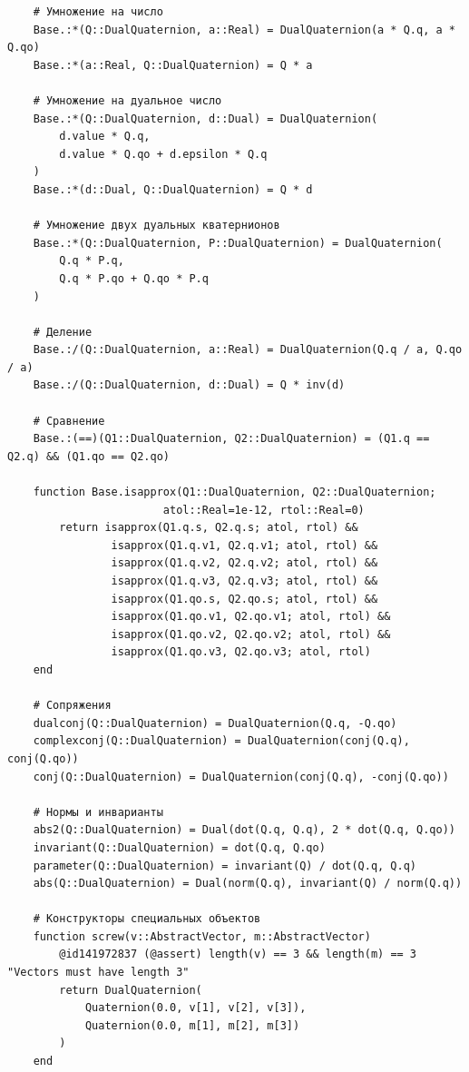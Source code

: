 \begin{verbatim}
    # Умножение на число
    Base.:*(Q::DualQuaternion, a::Real) = DualQuaternion(a * Q.q, a * Q.qo)
    Base.:*(a::Real, Q::DualQuaternion) = Q * a
    
    # Умножение на дуальное число
    Base.:*(Q::DualQuaternion, d::Dual) = DualQuaternion(
        d.value * Q.q,
        d.value * Q.qo + d.epsilon * Q.q
    )
    Base.:*(d::Dual, Q::DualQuaternion) = Q * d
    
    # Умножение двух дуальных кватернионов
    Base.:*(Q::DualQuaternion, P::DualQuaternion) = DualQuaternion(
        Q.q * P.q,
        Q.q * P.qo + Q.qo * P.q
    )
    
    # Деление
    Base.:/(Q::DualQuaternion, a::Real) = DualQuaternion(Q.q / a, Q.qo / a)
    Base.:/(Q::DualQuaternion, d::Dual) = Q * inv(d)
    
    # Сравнение
    Base.:(==)(Q1::DualQuaternion, Q2::DualQuaternion) = (Q1.q == Q2.q) && (Q1.qo == Q2.qo)
    
    function Base.isapprox(Q1::DualQuaternion, Q2::DualQuaternion; 
                        atol::Real=1e-12, rtol::Real=0)
        return isapprox(Q1.q.s, Q2.q.s; atol, rtol) &&
                isapprox(Q1.q.v1, Q2.q.v1; atol, rtol) &&
                isapprox(Q1.q.v2, Q2.q.v2; atol, rtol) &&
                isapprox(Q1.q.v3, Q2.q.v3; atol, rtol) &&
                isapprox(Q1.qo.s, Q2.qo.s; atol, rtol) &&
                isapprox(Q1.qo.v1, Q2.qo.v1; atol, rtol) &&
                isapprox(Q1.qo.v2, Q2.qo.v2; atol, rtol) &&
                isapprox(Q1.qo.v3, Q2.qo.v3; atol, rtol)
    end
    
    # Сопряжения
    dualconj(Q::DualQuaternion) = DualQuaternion(Q.q, -Q.qo)
    complexconj(Q::DualQuaternion) = DualQuaternion(conj(Q.q), conj(Q.qo))
    conj(Q::DualQuaternion) = DualQuaternion(conj(Q.q), -conj(Q.qo))
    
    # Нормы и инварианты
    abs2(Q::DualQuaternion) = Dual(dot(Q.q, Q.q), 2 * dot(Q.q, Q.qo))
    invariant(Q::DualQuaternion) = dot(Q.q, Q.qo)
    parameter(Q::DualQuaternion) = invariant(Q) / dot(Q.q, Q.q)
    abs(Q::DualQuaternion) = Dual(norm(Q.q), invariant(Q) / norm(Q.q))
    
    # Конструкторы специальных объектов
    function screw(v::AbstractVector, m::AbstractVector)
        @id141972837 (@assert) length(v) == 3 && length(m) == 3 "Vectors must have length 3"
        return DualQuaternion(
            Quaternion(0.0, v[1], v[2], v[3]),
            Quaternion(0.0, m[1], m[2], m[3])
        )
    end
    

\end{verbatim}
